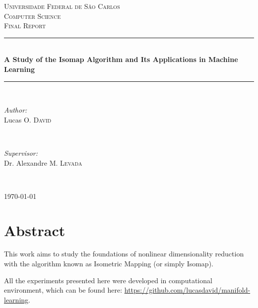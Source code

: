 \documentclass[12pt]{article}
\begin{document}
\begin{titlepage}

\newcommand{\HRule}{\rule{\linewidth}{0.5mm}}

\center

\textsc{\LARGE Universidade Federal de São Carlos}\\[1.5cm]
\textsc{\Large Computer Science}\\[0.5cm]
\textsc{\large Final Report}\\[0.5cm]

\HRule \\[0.4cm]

{ \huge \bfseries A Study of the Isomap Algorithm and Its Applications in Machine Learning}\\[0.4cm]

\HRule \\[1.5cm]

\begin{minipage}{0.4\textwidth}
\begin{flushleft} \large
\emph{Author:}\\
Lucas O. \textsc{David}
\end{flushleft}
\end{minipage}
~
\begin{minipage}{0.4\textwidth}
\begin{flushright} \large
\emph{Supervisor:} \\
Dr. Alexandre M. \textsc{Levada}
\end{flushright}
\end{minipage}\\[4cm]

\vfill

{\large \today}\\[3cm]

\end{titlepage}

\tableofcontents

\newpage

\section{Abstract}

This work aims to study the foundations of nonlinear dimensionality reduction with the algorithm known as Isometric Mapping (or simply Isomap).

All the experiments presented here were developed in computational environment, which can be found here: \url{https://github.com/lucasdavid/manifold-learning}.
\end{document}
